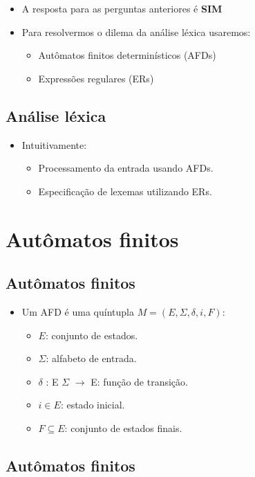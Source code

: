 \documentclass[11pt]{article}
\begin{document}
\begin{itemize}
\item A resposta para as perguntas anteriores é \textbf{SIM}

\item Para resolvermos o dilema da análise léxica usaremos:
\begin{itemize}
\item Autômatos finitos determinísticos (AFDs)
\item Expressões regulares (ERs)
\end{itemize}
\end{itemize}
\subsection*{Análise léxica}
\label{sec:org21aa1ae}

\begin{itemize}
\item Intuitivamente:
\begin{itemize}
\item Processamento da entrada usando AFDs.
\item Especificação de lexemas utilizando ERs.
\end{itemize}
\end{itemize}
\section*{Autômatos finitos}
\label{sec:org2a939ae}

\subsection*{Autômatos finitos}
\label{sec:org637b6c4}

\begin{itemize}
\item Um AFD é uma quíntupla \(M=(E,\Sigma,\delta,i,F)\):
\begin{itemize}
\item \(E\): conjunto de estados.
\item \(\Sigma\): alfabeto de entrada.
\item \(\delta\) : E \texttimes{} \(\Sigma\) \(\to\) E: função de transição.
\item \(i\in E\): estado inicial.
\item \(F\subseteq E\): conjunto de estados finais.
\end{itemize}
\end{itemize}
\subsection*{Autômatos finitos}
\label{sec:org88ccf95}
\end{document}
